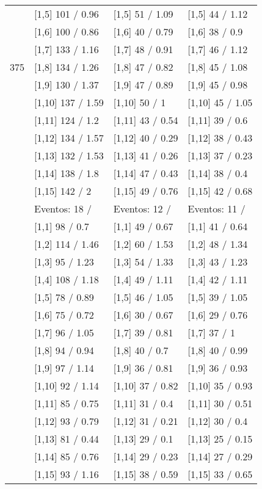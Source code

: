 \begin{table}
\begin{tabular}[t]{llll}
 & {}[1,5] 101  / 0.96 & {}[1,5] 51  / 1.09 & {}[1,5] 44  / 1.12\\
 & {}[1,6] 100  / 0.86 & {}[1,6] 40  / 0.79 & {}[1,6] 38  / 0.9\\
 & {}[1,7] 133  / 1.16 & {}[1,7] 48  / 0.91 & {}[1,7] 46  / 1.12\\
375 & {}[1,8] 134  / 1.26 & {}[1,8] 47  / 0.82 & {}[1,8] 45  / 1.08\\
\addlinespace
 & {}[1,9] 130  / 1.37 & {}[1,9] 47  / 0.89 & {}[1,9] 45  / 0.98\\
 & {}[1,10] 137  / 1.59 & {}[1,10] 50  / 1 & {}[1,10] 45  / 1.05\\
 & {}[1,11] 124  / 1.2 & {}[1,11] 43  / 0.54 & {}[1,11] 39  / 0.6\\
 & {}[1,12] 134  / 1.57 & {}[1,12] 40  / 0.29 & {}[1,12] 38  / 0.43\\
 & {}[1,13] 132  / 1.53 & {}[1,13] 41  / 0.26 & {}[1,13] 37  / 0.23\\
\addlinespace
 & {}[1,14] 138  / 1.8 & {}[1,14] 47  / 0.43 & {}[1,14] 38  / 0.4\\
 & {}[1,15] 142  / 2 & {}[1,15] 49  / 0.76 & {}[1,15] 42  / 0.68\\
 & Eventos:  18 / & Eventos:  12 / & Eventos:  11 /\\
 & {}[1,1] 98  / 0.7 & {}[1,1] 49  / 0.67 & {}[1,1] 41  / 0.64\\
 & {}[1,2] 114  / 1.46 & {}[1,2] 60  / 1.53 & {}[1,2] 48  / 1.34\\
\addlinespace
 & {}[1,3] 95  / 1.23 & {}[1,3] 54  / 1.33 & {}[1,3] 43  / 1.23\\
 & {}[1,4] 108  / 1.18 & {}[1,4] 49  / 1.11 & {}[1,4] 42  / 1.11\\
 & {}[1,5] 78  / 0.89 & {}[1,5] 46  / 1.05 & {}[1,5] 39  / 1.05\\
 & {}[1,6] 75  / 0.72 & {}[1,6] 30  / 0.67 & {}[1,6] 29  / 0.76\\
 & {}[1,7] 96  / 1.05 & {}[1,7] 39  / 0.81 & {}[1,7] 37  / 1\\
\addlinespace
500 & {}[1,8] 94  / 0.94 & {}[1,8] 40  / 0.7 & {}[1,8] 40  / 0.99\\
 & {}[1,9] 97  / 1.14 & {}[1,9] 36  / 0.81 & {}[1,9] 36  / 0.93\\
 & {}[1,10] 92  / 1.14 & {}[1,10] 37  / 0.82 & {}[1,10] 35  / 0.93\\
 & {}[1,11] 85  / 0.75 & {}[1,11] 31  / 0.4 & {}[1,11] 30  / 0.51\\
 & {}[1,12] 93  / 0.79 & {}[1,12] 31  / 0.21 & {}[1,12] 30  / 0.4\\
\addlinespace
 & {}[1,13] 81  / 0.44 & {}[1,13] 29  / 0.1 & {}[1,13] 25  / 0.15\\
 & {}[1,14] 85  / 0.76 & {}[1,14] 29  / 0.23 & {}[1,14] 27  / 0.29\\
 & {}[1,15] 93  / 1.16 & {}[1,15] 38  / 0.59 & {}[1,15] 33  / 0.65\\
\bottomrule
\end{tabular}
\end{table}
